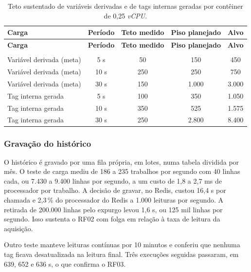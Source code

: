 {\renewcommand{\arraystretch}{1.3}\small
\begin{xltabular}{\textwidth}{lcccc}
        \caption{Teto sustentado de variáveis derivadas e de tags internas geradas por contêiner de 0,25 \emph{vCPU}.}
        \label{tab:cap7_meta}\\
        \hline
        \textbf{Carga} & \textbf{Período} & \textbf{Teto medido} & \textbf{Piso planejado} & \textbf{Alvo} \\
        \hline
        \endfirsthead
        \hline
        \textbf{Carga} & \textbf{Período} & \textbf{Teto medido} & \textbf{Piso planejado} & \textbf{Alvo} \\
        \hline
        \endhead
        \endfoot
         \\
        \endlastfoot
        Variável derivada (meta) & 5 s & 50 & 150 & 450 \\
        \hline
        Variável derivada (meta) & 10 s & 250 & 250 & 750 \\
        \hline
        Variável derivada (meta) & 30 s & 150 & 1.000 & 3.000 \\
        \hline
        Tag interna gerada & 5 s & 100 & 350 & 1.050 \\
        \hline
        Tag interna gerada & 10 s & 350 & 525 & 1.575 \\
        \hline
        Tag interna gerada & 30 s & 250 & 2.800 & 8.400 \\
        \hline
\end{xltabular}}

\subsubsection{Gravação do histórico}

\par O histórico é gravado por uma fila própria, em lotes, numa tabela dividida por mês. O teste de carga mediu de 186 a 235 trabalhos por segundo com 40 linhas cada, ou 7.430 a 9.400 linhas por segundo, a um custo de 1,8 a 2,7 ms de processador por trabalho. A decisão de gravar, no Redis, custou 16,4 \textmu s por chamada e 2,3\,\% do processador do Redis a 1.000 leituras por segundo. A retirada de 200.000 linhas pelo expurgo levou 1,6 s, ou 125 mil linhas por segundo. Isso sustenta o RF02 com folga em relação à taxa de leitura da aquisição.

\par Outro teste manteve leituras contínuas por 10 minutos e conferiu que nenhuma tag ficava desatualizada na leitura final. Três execuções seguidas passaram, em 639, 652 e 636 s, o que confirma o RF03.

